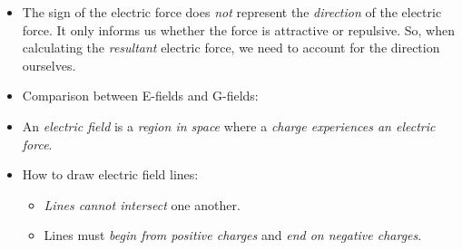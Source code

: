 \documentclass[oneside]{book}
\begin{document}
\begin{itemize}
  \item The sign of the electric force does \emph{not} represent the \emph{direction} of the electric force. It only informs us whether the force is attractive or repulsive. So, when calculating the \emph{resultant} electric force, we need to account for the direction ourselves. 
    \item Comparison between E-fields and G-fields: 
    \begin{center}
    \end{center}
    \item An \emph{electric field} is a \emph{region in space} where a \emph{charge experiences an electric force}.
    \item How to draw electric field lines: 
    \begin{itemize}
        \item \emph{Lines cannot intersect} one another.
        \item Lines must \emph{begin from positive charges} and \emph{end on negative charges}.

\end{itemize}
\end{itemize}
\end{document}
